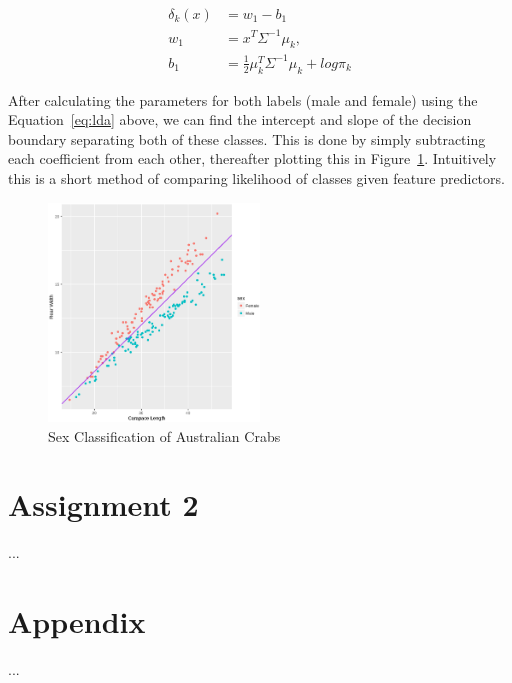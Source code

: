 \documentclass[a4paper, twocolumn]{article}
\begin{document}
        \begin{equation} \label{eq:lda}
          \begin{split}
            \delta_k(x) &=  w_1 - b_1 \\
            w_1 &= x^{T}\Sigma^{-1}\mu_k, \\
            b_1 &= \frac{1}{2}\mu_k^{T}\Sigma^{-1}\mu_k+log\pi_k
          \end{split}
        \end{equation}

        After calculating the parameters for both labels (male and female) using the Equation~\ref{eq:lda} above, we can find the intercept and slope of the decision boundary
        separating both of these classes. This is done by simply subtracting each coefficient from each other, thereafter plotting this in Figure~\ref{fig:boundary}. Intuitively this
        is a short method of comparing likelihood of classes given feature predictors.     

        \begin{figure}
          \centering
          \caption{Sex Classification of Australian Crabs}
          \label{fig:boundary}
          \includegraphics[width=0.5\textwidth]{share/boundary.eps}
        \end{figure}


    \section*{Assignment 2}

        ...

    \nocite{*} %
    
    
    \onecolumn \appendix
    \section*{Appendix}

        ...
\end{document}
